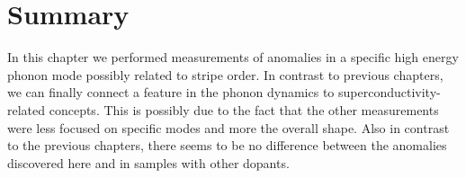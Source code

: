 \section{Summary}
In this chapter we performed measurements of anomalies in a specific high energy phonon mode possibly related to stripe order. In contrast to previous chapters, we can finally connect a feature in the phonon dynamics to superconductivity-related concepts. This is possibly due to the fact that the other measurements were less focused on specific modes and more the overall shape. Also in contrast to the previous chapters, there seems to be no difference between the anomalies discovered here and in samples with other dopants.





